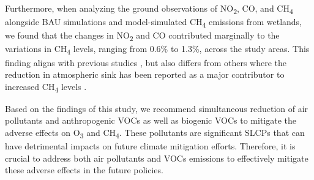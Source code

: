 Furthermore, when analyzing the ground observations of NO\textsubscript{2}, CO, and CH\textsubscript{4} alongside BAU simulations and model-simulated CH\textsubscript{4} emissions from wetlands, we found that the changes in NO\textsubscript{2} and CO contributed marginally to the variations in CH\textsubscript{4} levels, ranging from 0.6\% to 1.3\%, across the study areas. This finding aligns with previous studies \citep{akimoto2022rethinking,qu2022attribution,feng2023methane}, but also differs from others where the reduction in atmospheric sink has been reported as a major contributor to increased CH\textsubscript{4} levels \citep{stevenson2022covid,peng2022wetland}.\par
Based on the findings of this study, we recommend simultaneous reduction of air pollutants and anthropogenic VOCs as well as biogenic VOCs to mitigate the adverse effects on O\textsubscript{3} and CH\textsubscript{4}. These pollutants are significant SLCPs that can have detrimental impacts on future climate mitigation efforts. Therefore, it is crucial to address both air pollutants and VOCs emissions to effectively mitigate these adverse effects in the future policies. \par
